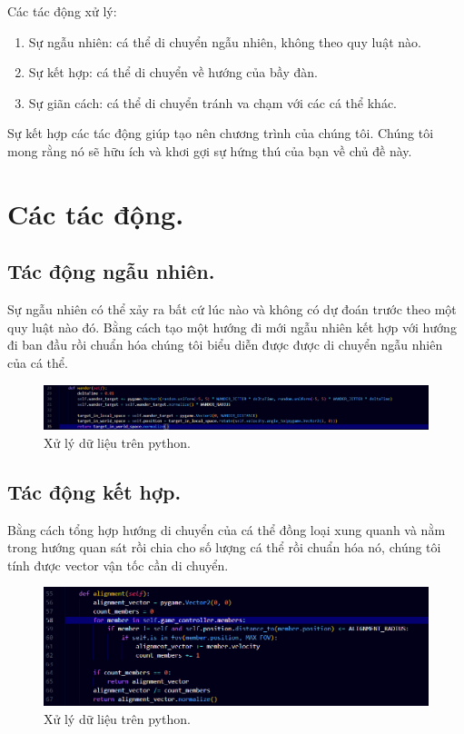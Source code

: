 \documentclass{article}
\begin{document}
Các tác động xử lý:
\begin{enumerate}
\item Sự ngẫu nhiên: cá thể di chuyển ngẫu nhiên, không theo quy luật nào.
\item Sự kết hợp: cá thể di chuyển về hướng của bầy đàn.
\item Sự giãn cách: cá thể di chuyển tránh va chạm với các cá thể khác.
\end{enumerate}
Sự kết hợp các tác động giúp tạo nên chương trình của chúng tôi. Chúng tôi mong rằng nó sẽ hữu ích và khơi gợi sự hứng thú của bạn về chủ đề này.

\section{Các tác động.}

\subsection{Tác động ngẫu nhiên.}
Sự ngẫu nhiên có thể xảy ra bất cứ lúc nào và không có dự đoán trước theo một quy luật nào đó. Bằng cách tạo một hướng đi mới ngẫu nhiên kết hợp với hướng đi ban đầu rồi chuẩn hóa chúng tôi biểu diễn được được di chuyển ngẫu nhiên của cá thể.\\

\begin{figure}[htbp]
  \centering
  \includegraphics[width=0.5\linewidth]{wander.png} 
  \caption{Xử lý dữ liệu trên python.}
\end{figure}
\vspace{3cm}
\subsection{Tác động kết hợp.}
Bằng cách tổng hợp hướng di chuyển của cá thể đồng loại xung quanh và nằm trong hướng quan sát rồi chia cho số lượng cá thể rồi chuẩn hóa nó, chúng tôi tính được vector vận tốc cần di chuyển.\\
\begin{figure}[htbp]
  \centering
  \includegraphics[width=0.5\linewidth]{alignment.png} 
  \caption{Xử lý dữ liệu trên python.}
\end{figure}
\end{document}
